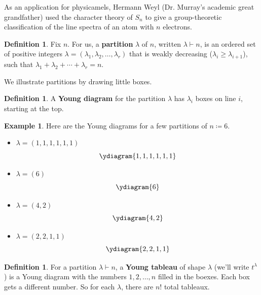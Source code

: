 \documentclass[12pt]{article}
\newcommand\paren[1]{\left( #1 \right)}
\theoremstyle{definition}
\newtheorem{definition}[theorem]{Definition}
\newtheorem{example}{Example}[section]
\begin{document}
As an application for physicamels, Hermann Weyl (Dr. Murray's academic great grandfather) used the character theory of $S_n$ to give a group-theoretic classification of the line spectra of an atom with $n$ electrons.
\begin{definition}
    Fix $n$. For us, a \textbf{partition} $\lambda$ of $n$, written $\lambda \vdash n$, is an ordered set of positive integers $\lambda = \paren{ \lambda_1 , \lambda_2 , \dotsc , \lambda_r }$ that is weakly decreasing ($\lambda_i \geq \lambda_{i+1}$), such that $\lambda_1 + \lambda_2 + \dotsb + \lambda_r = n$. 
\end{definition}
We illustrate partitions by drawing little boxes.
\begin{definition}
    A \textbf{Young diagram} for the partition $\lambda$ has $\lambda_i$ boxes on line $i$, starting at the top.
\end{definition}
\begin{example}
    Here are the Young diagrams for a few partitions of $n \coloneqq  6$.
    \begin{itemize}
        \item $\lambda = (1,1,1,1,1,1)$
        \begin{equation}
            \ydiagram{1,1,1,1,1,1}
        \end{equation}
        \item $\lambda = (6)$
        \begin{equation}
            \ydiagram{6}
        \end{equation}
        \item $\lambda = (4,2)$
        \begin{equation}
            \ydiagram{4,2}
        \end{equation}
        \item $\lambda = (2,2,1,1)$
        \begin{equation}
            \ydiagram{2,2,1,1}
        \end{equation}
    \end{itemize}
\end{example}
\begin{definition}
    For a partition $\lambda \vdash n$, a \textbf{Young tableau} of shape $\lambda$ (we'll write $t^{\lambda}$) is a Young diagram with the numbers $1,2,\dotsc,n$ filled in the boexes. Each box gets a different number. So for each $\lambda$, there are $\boxed{n!}$ total tableaux.
\end{definition}
\end{document}
